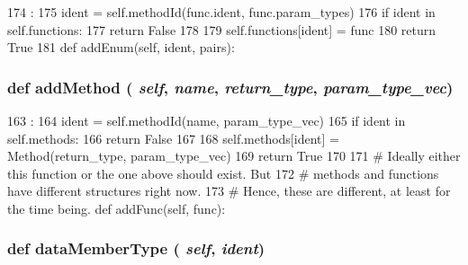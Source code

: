 \begin{DoxyCode}
174                            :
175         ident = self.methodId(func.ident, func.param_types)
176         if ident in self.functions:
177             return False
178 
179         self.functions[ident] = func
180         return True
181 
    def addEnum(self, ident, pairs):
\end{DoxyCode}
\hypertarget{classslicc_1_1symbols_1_1Type_1_1Type_aee4a8b4b7ae064aa9fa7ba2b8730f4ab}{
\subsubsection[{addMethod}]{\setlength{\rightskip}{0pt plus 5cm}def addMethod ( {\em self}, \/   {\em name}, \/   {\em return\_\-type}, \/   {\em param\_\-type\_\-vec})}}
\label{classslicc_1_1symbols_1_1Type_1_1Type_aee4a8b4b7ae064aa9fa7ba2b8730f4ab}



\begin{DoxyCode}
163                                                           :
164         ident = self.methodId(name, param_type_vec)
165         if ident in self.methods:
166             return False
167 
168         self.methods[ident] = Method(return_type, param_type_vec)
169         return True
170 
171     # Ideally either this function or the one above should exist. But
172     # methods and functions have different structures right now.
173     # Hence, these are different, at least for the time being.
    def addFunc(self, func):
\end{DoxyCode}
\hypertarget{classslicc_1_1symbols_1_1Type_1_1Type_aba05d1e636b4a17dc3fed9f793f31fd3}{
\subsubsection[{dataMemberType}]{\setlength{\rightskip}{0pt plus 5cm}def dataMemberType ( {\em self}, \/   {\em ident})}}
\label{classslicc_1_1symbols_1_1Type_1_1Type_aba05d1e636b4a17dc3fed9f793f31fd3}



